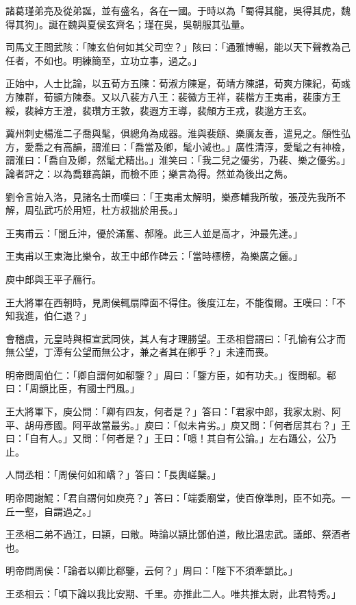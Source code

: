 諸葛瑾弟亮及從弟誕，並有盛名，各在一國。于時以為「蜀得其龍，吳得其虎，魏得其狗」。誕在魏與夏侯玄齊名；瑾在吳，吳朝服其弘量。

司馬文王問武陔：「陳玄伯何如其父司空？」陔曰：「通雅博暢，能以天下聲教為己任者，不如也。明練簡至，立功立事，過之。」

正始中，人士比論，以五荀方五陳：荀淑方陳寔，荀靖方陳諶，荀爽方陳紀，荀彧方陳群，荀顗方陳泰。又以八裴方八王：裴徽方王祥，裴楷方王夷甫，裴康方王綏，裴綽方王澄，裴瓚方王敦，裴遐方王導，裴頠方王戎，裴邈方王玄。

冀州刺史楊淮二子喬與髦，俱總角為成器。淮與裴頠、樂廣友善，遣見之。頠性弘方，愛喬之有高韻，謂淮曰：「喬當及卿，髦小減也。」廣性清淳，愛髦之有神檢，謂淮曰：「喬自及卿，然髦尤精出。」淮笑曰：「我二兒之優劣，乃裴、樂之優劣。」論者評之：以為喬雖高韻，而檢不匝；樂言為得。然並為後出之雋。

劉令言始入洛，見諸名士而嘆曰：「王夷甫太解明，樂彥輔我所敬，張茂先我所不解，周弘武巧於用短，杜方叔拙於用長。」

王夷甫云：「閭丘沖，優於滿奮、郝隆。此三人並是高才，沖最先達。」

王夷甫以王東海比樂令，故王中郎作碑云：「當時標榜，為樂廣之儷。」

庾中郎與王平子鴈行。

王大將軍在西朝時，見周侯輒扇障面不得住。後度江左，不能復爾。王嘆曰：「不知我進，伯仁退？」

會稽虞，元皇時與桓宣武同俠，其人有才理勝望。王丞相嘗謂曰：「孔愉有公才而無公望，丁潭有公望而無公才，兼之者其在卿乎？」未達而喪。

明帝問周伯仁：「卿自謂何如郗鑒？」周曰：「鑒方臣，如有功夫。」復問郗。郗曰：「周顗比臣，有國士門風。」

王大將軍下，庾公問：「卿有四友，何者是？」答曰：「君家中郎，我家太尉、阿平、胡毋彥國。阿平故當最劣。」庾曰：「似未肯劣。」庾又問：「何者居其右？」王曰：「自有人。」又問：「何者是？」王曰：「噫！其自有公論。」左右躡公，公乃止。

人問丞相：「周侯何如和嶠？」答曰：「長輿嵯櫱。」

明帝問謝鯤：「君自謂何如庾亮？」答曰：「端委廟堂，使百僚準則，臣不如亮。一丘一壑，自謂過之。」

王丞相二弟不過江，曰頴，曰敞。時論以頴比鄧伯道，敞比溫忠武。議郎、祭酒者也。

明帝問周侯：「論者以卿比郗鑒，云何？」周曰：「陛下不須牽顗比。」

王丞相云：「頃下論以我比安期、千里。亦推此二人。唯共推太尉，此君特秀。」

